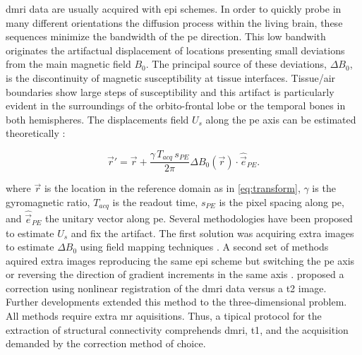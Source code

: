 \Gls*{dmri} data are usually acquired with \gls*{epi} schemes.
In order to quickly probe  in many different orientations the diffusion process within the living
  brain, these sequences minimize the bandwidth of the \gls*{pe} direction.
This low bandwith originates the artifactual displacement of locations presenting small deviations
  from the main magnetic field $B_0$.
The principal source of these deviations, $\Delta B_0$, is the discontinuity of magnetic
  susceptibility at tissue interfaces.
Tissue/air boundaries show large steps of susceptibility and this artifact is
  particularly evident in the surroundings of the orbito-frontal lobe or the temporal
  bones in both hemispheres.
The displacements field $U_s$ along the \gls*{pe} axis can be estimated theoretically
  \citep{jezzard_correction_1995}:

  \begin{equation}
  \vec{r}' = \vec{r} + \frac{\gamma \, T_{acq}\, s_{PE}}{2\pi}\Delta B_0(\vec{r}) \cdot \hat{\vec{e}}_{PE}.
  \label{eq:fieldmap}
  \end{equation}

where $\vec{r}$ is the location in the reference domain as in \eqref{eq:transform},
  $\gamma$ is the gyromagnetic ratio, $T_{acq}$ is the readout time,
  $s_{PE}$ is the pixel spacing along \gls*{pe}, and $\hat{\vec{e}}_{PE}$ the unitary
  vector along \gls*{pe}.
Several methodologies have been proposed to estimate $U_s$ and fix the artifact.
The first solution was acquiring extra images to estimate $\Delta B_0$ using field mapping
  techniques \citep{jezzard_correction_1995,andersson_modeling_2001}.
A second set of methods aquired extra images reproducing the same \gls*{epi} scheme but switching
  the \gls*{pe} axis \citep{chiou_simple_2000} or reversing the direction of gradient
  increments in the same axis \citep{cordes_geometric_2000,holland_efficient_2010}.
\cite{kybic_unwarping_2000} proposed a correction using nonlinear registration of the \gls*{dmri}
  data versus a \gls*{t2} image.
Further developments \citep{irfanoglu_susceptibility_2011} extended this method to the
  three-dimensional problem.
All methods require extra \gls*{mr} aquisitions. Thus, a tipical protocol for the extraction
  of structural connectivity comprehends \gls*{dmri}, \gls*{t1}, and the acquisition demanded
  by the correction method of choice.

